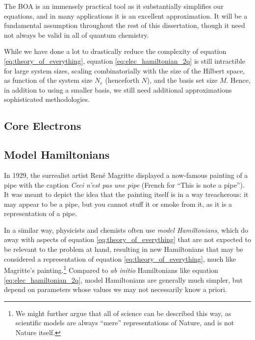 The \gls{BOA} is an immensely practical tool as it substantially simplifies our equations, and in many applications it is an excellent approximation. It will be a fundamental assumption throughout the rest of this dissertation, though it need not always be valid in all of quantum chemistry.

While we have done a lot to drastically reduce the complexity of equation \eqref{eq:theory_of_everything}, equation \eqref{eq:elec_hamiltonian_2q} is still intractible for large system sizes, scaling combinatorially with the size of the Hilbert space, as function of the system size $N_e$ (henceforth $N$), and the basis set size $M$. Hence, in addition to using a smaller basis, we still need additional approximations sophisticated methodologies.


\subsection{Core Electrons}




\subsection{Model Hamiltonians}

In 1929, the surrealist artist Ren\'e Magritte displayed a now-famous painting of a pipe with the caption \emph{Ceci n'est pas une pipe} (French for ``This is note a pipe''). It was meant to depict the idea that the painting itself is in a way treacherous: it may appear to be a pipe, but you cannot stuff it or smoke from it, as it is a representation of a pipe.

In a similar way, physicists and chemists often use \emph{model Hamiltonians}, which do away with aspects of equation \eqref{eq:theory_of_everything} that are not expected to be relevant to the problem at hand, resulting in new Hamiltonians that may be considered a representation of equation \eqref{eq:theory_of_everything}, much like Magritte's painting.\footnote{We might further argue that all of science can be described this way, as scientific models are always ``mere'' representations of Nature, and is not Nature itself.} Compared to \emph{ab initio} Hamiltonians like equation \eqref{eq:elec_hamiltonian_2q}, model Hamiltonians are generally much simpler, but depend on parameters whose values we may not necessarily know a priori.


